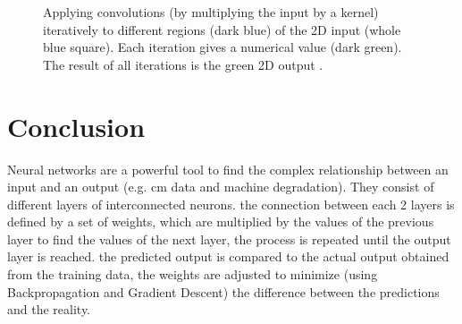 \begin{figure}[H]
\begin{subfigure}{0.22\linewidth}
    \end{subfigure}
    \caption{Applying convolutions (by multiplying the input by a kernel) iteratively to different regions (dark blue) of the 2D input (whole blue square). Each iteration gives a numerical value (dark green). The result of all iterations is the green 2D output \cite{dumoulin2016guide}.}
    \label{fig:convolutions}
\end{figure}

\section{Conclusion}
Neural networks are a powerful tool to find the complex relationship between an input and an output (e.g. \acrlong{cm} data and machine degradation). They consist of different layers of interconnected neurons. the connection between each 2 layers is defined by a set of weights, which are multiplied by the values of the previous layer to find the values of the next layer, the process is repeated until the output layer is reached. the predicted output is compared to the actual output obtained from the training data, the weights are adjusted to minimize (using Backpropagation and Gradient Descent) the difference between the predictions and the reality.
